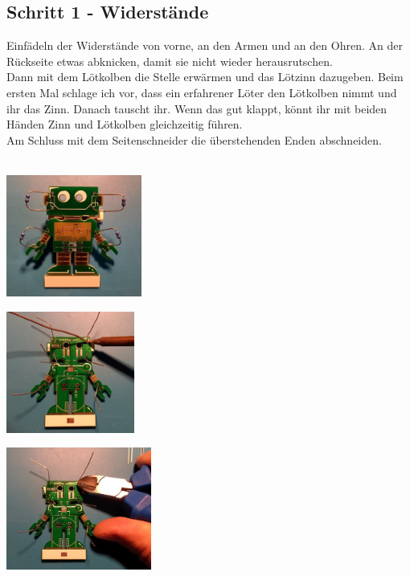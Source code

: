 \documentclass[a4paper]{article}
\begin{document}
\subsection{Schritt 1 - Widerstände}
Einfädeln der Widerstände von vorne, an den Armen und an den Ohren. An der Rückseite etwas abknicken, damit sie nicht wieder herausrutschen.\\
Dann mit dem Lötkolben die Stelle erwärmen und das Lötzinn dazugeben. Beim ersten Mal schlage ich vor, dass ein erfahrener Löter den Lötkolben nimmt und ihr das Zinn. Danach tauscht ihr. Wenn das gut klappt, könnt ihr mit beiden Händen Zinn und Lötkolben gleichzeitig führen. \\
Am Schluss mit dem Seitenschneider die überstehenden Enden abschneiden.\\
\ \\
\begin{minipage}[t]{0.33\textwidth}
  \centering
  \includegraphics[height=4cm]{../pictures/Resistor1.jpg}
  \label{img:Resistor1}
  \end{minipage}
\begin{minipage}[t]{0.33\textwidth}
  \centering
  \includegraphics[height=4cm]{../pictures/Resistor2.jpg}
  \label{img:Resistor2}
\end{minipage}
\begin{minipage}[t]{0.33\textwidth}
  \centering
  \includegraphics[height=4cm]{../pictures/Resistor3.jpg}
  \label{img:Resistor3}
\end{minipage}
\end{document}
